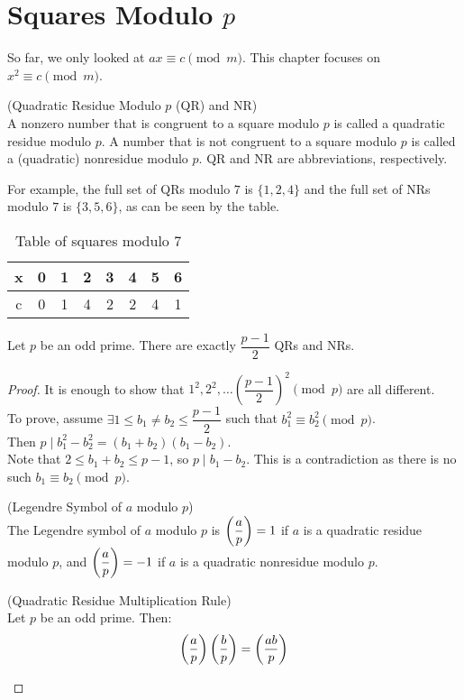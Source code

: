 \section{Squares Modulo $p$}

So far, we only looked at $ax\equiv c \pmod{m}$. This chapter focuses on $x^{2}\equiv c \pmod{m}$.

\begin{definition}
(Quadratic Residue Modulo $p$ (QR) and NR) \\
A nonzero number that is congruent to a square modulo $p$ is called a quadratic residue modulo $p$. A number that is not congruent to a square modulo $p$ is called a (quadratic) nonresidue modulo $p$. QR and NR are abbreviations, respectively. 
\end{definition}

\noindent
For example, the full set of QRs modulo $7$ is $\{1, 2, 4\}$ and the full set of NRs modulo $7$ is $\{3, 5, 6\}$, as can be seen by the table.

\begin{table}[h!]
\centering
\begin{tabular}{||c c c c c c c c||} 
  \hline \hline
  x & 0 & 1 & 2 & 3 & 4 & 5 & 6 \\
  \hline
  c & 0 & 1 & 4 & 2 & 2 & 4 & 1 \\ 
  \hline \hline
\end{tabular}
\caption{Table of squares modulo 7}
\end{table}

\begin{theorem}
Let $p$ be an odd prime. There are exactly $\dfrac{p - 1}{2}$ QRs and NRs.
\end{theorem}

\begin{proof}
It is enough to show that $1^{2}, 2^{2},\dots (\dfrac{p - 1}{2})^{2} \pmod{p}$ are all different. \\
To prove, assume $\exists 1\leq b_{1}\neq b_{2}\leq \dfrac{p - 1}{2}$ such that $b_{1}^{2}\equiv b_{2}^{2} \pmod{p}$. \\
Then $p\mid b_{1}^{2} - b_{2}^{2} = (b_{1} + b_{2})(b_{1} - b_{2})$. \\
Note that $2\leq b_{1} + b_{2}\leq p - 1$, so $p\mid b_{1} - b_{2}$. This is a contradiction as there is no such $b_{1}\equiv b_{2} \pmod{p}$.

\begin{definition}
(Legendre Symbol of $a$ modulo $p$) \\
The Legendre symbol of $a$ modulo $p$ is $\left( \dfrac{a}{p} \right)  = 1$ if $a$ is a quadratic residue modulo $p$, and $\left( \dfrac{a}{p} \right)  = -1$ if $a$ is a quadratic nonresidue modulo $p$.
\end{definition}

\begin{theorem}
(Quadratic Residue Multiplication Rule) \\
Let $p$ be an odd prime. Then: \[\left( \dfrac{a}{p} \right)  \left( \dfrac{b}{p} \right)  = \left( \dfrac{ab}{p} \right) \]
\end{theorem}
\end{proof}


